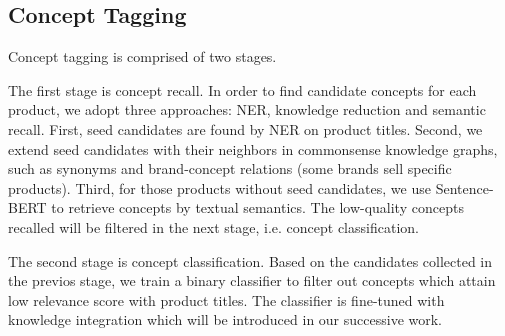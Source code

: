 \subsection{Concept Tagging}
Concept tagging is comprised of two stages.

The first stage is concept recall. 
In order to find candidate concepts for each product, we adopt three approaches: NER, knowledge reduction and semantic recall. 
First, seed candidates are found by NER on product titles.
Second, we extend seed candidates with their neighbors in commonsense knowledge graphs, such as synonyms and brand-concept relations (some brands sell specific products). 
Third, for those products without seed candidates, we use Sentence-BERT to retrieve concepts by textual semantics.
The low-quality concepts recalled will be filtered in the next stage, i.e. concept classification. 

The second stage is concept classification. Based on the candidates collected in the previos stage, we train a binary classifier to filter out concepts which attain low relevance score with product titles. The classifier is fine-tuned with knowledge integration which will be introduced in our successive work.

